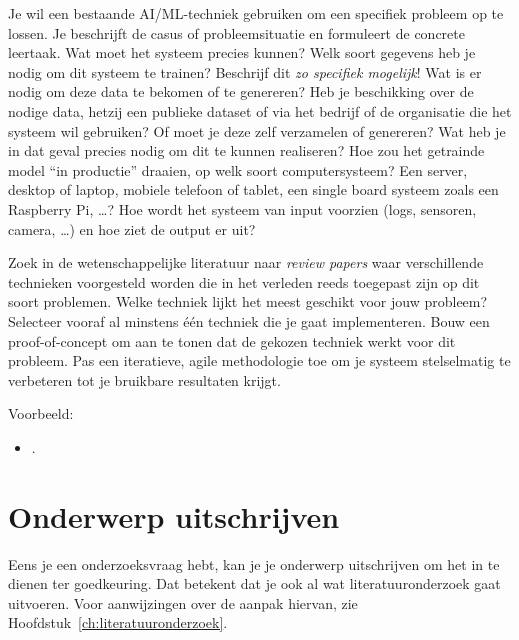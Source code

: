 Je wil een bestaande AI/ML-techniek gebruiken om een specifiek probleem op te lossen. Je beschrijft de casus of probleemsituatie en formuleert de concrete leertaak. Wat moet het systeem precies kunnen? Welk soort gegevens heb je nodig om dit systeem te trainen? Beschrijf dit \emph{zo specifiek mogelijk}! Wat is er nodig om deze data te bekomen of te genereren? Heb je beschikking over de nodige data, hetzij een publieke dataset of via het bedrijf of de organisatie die het systeem wil gebruiken? Of moet je deze zelf verzamelen of genereren? Wat heb je in dat geval precies nodig om dit te kunnen realiseren? Hoe zou het getrainde model ``in productie'' draaien, op welk soort computersysteem? Een server, desktop of laptop, mobiele telefoon of tablet, een single board systeem zoals een Raspberry Pi, \ldots? Hoe wordt het systeem van input voorzien (logs, sensoren, camera, \ldots) en hoe ziet de output er uit?

Zoek in de wetenschappelijke literatuur naar \emph{review papers} waar verschillende technieken voorgesteld worden die in het verleden reeds toegepast zijn op dit soort problemen. Welke techniek lijkt het meest geschikt voor jouw probleem? Selecteer vooraf al minstens één techniek die je gaat implementeren. Bouw een proof-of-con\-cept om aan te tonen dat de gekozen techniek werkt voor dit probleem. Pas een iteratieve, agile methodologie toe om je systeem stelselmatig te verbeteren tot je bruikbare resultaten krijgt.

Voorbeeld:

\begin{itemize}
  \item {} \autocite{Cluyse2023}.
\end{itemize}



\section{Onderwerp uitschrijven}%
\label{sec:onderwerp_uitschrijven}

Eens je een onderzoeksvraag hebt, kan je je onderwerp uitschrijven om het in te dienen ter goedkeuring. Dat betekent dat je ook al wat literatuuronderzoek gaat uitvoeren. Voor aanwijzingen over de aanpak hiervan, zie Hoofdstuk~\ref{ch:literatuuronderzoek}.


